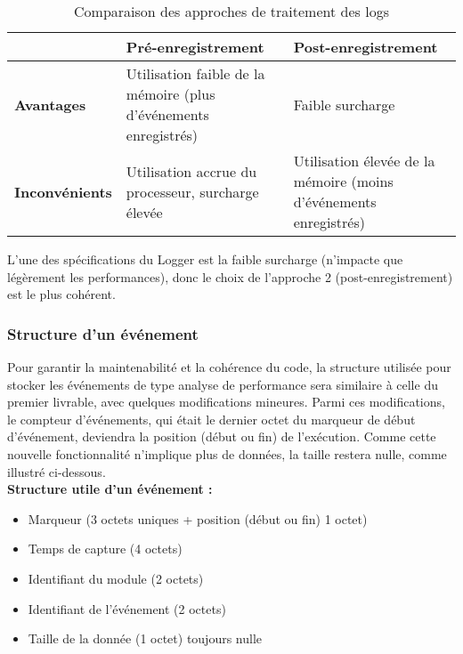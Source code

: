 \documentclass[a4paper, 12pt]{report}
\begin{document}
     \begin{table}[H]
            \begin{center}
                
            \begin{tabularx}{\textwidth} { 
              | >{\centering\arraybackslash}X 
              | >{\centering\arraybackslash}X 
              | >{\centering\arraybackslash}X | }
             \hline
              & \textbf{Pré-enregistrement} & \textbf{Post-enregistrement} \\
             \hline
            \textbf{Avantages}  & Utilisation faible de la mémoire (plus d'événements enregistrés)  & Faible surcharge \\
            \hline
            \textbf{Inconvénients} & Utilisation accrue du processeur, surcharge élevée & Utilisation élevée de la mémoire (moins d'événements enregistrés)
  \\
  \hline
            \end{tabularx}
            \caption{Comparaison des approches de traitement des logs}
            \label{tab:lvrbl2-traitement}
            \end{center}
            \end{table}


L’une des spécifications du Logger est la faible surcharge (n'impacte que légèrement les performances), donc le choix de l’approche 2
(post-enregistrement) est le plus cohérent.

\subsubsection{Structure d'un événement}
Pour garantir la maintenabilité et la cohérence du code, la structure utilisée pour stocker les événements de type analyse de performance sera similaire à celle du premier livrable, avec quelques modifications mineures. Parmi ces modifications, le compteur d'événements, qui était le dernier octet du marqueur de début d'événement, deviendra la position (début ou fin) de l'exécution. Comme cette nouvelle fonctionnalité n'implique plus de données, la taille restera nulle, comme illustré ci-dessous.\\
 \textbf{Structure utile d’un événement :}
        \begin{itemize}
                \item Marqueur (3 octets uniques + position (début ou fin) 1 octet)
                \item Temps de capture (4 octets)
                \item Identifiant du module (2 octets)
                \item Identifiant de l'événement (2 octets)
                \item Taille de la donnée (1 octet) toujours nulle

        \end{itemize}
        
\end{document}
